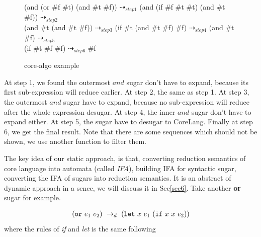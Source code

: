 \begin{figure}[ht]
\parbox[t]{\textwidth}{
\begin{Codes}
    (and (or \#f \#t) (and \#t \#f)) $\dashrightarrow_{step1}$
(and (if \#f \#t \#t) (and \#t \#f)) $\dashrightarrow_{step2}$\\
(and \#t (and \#t \#f)) $\dashrightarrow_{step3}$
(if \#t (and \#t \#f) \#f) $\dashrightarrow_{step4}$
(and \#t \#f) $\dashrightarrow_{step5}$\\
(if \#t \#f \#f) $\dashrightarrow_{step6}$
\#f
\end{Codes}
		}
\caption{core-algo example}
\label{fig:core-algo}
\end{figure}

At step 1, we found the outermost $and$ sugar don't have to expand, because its first sub-expression will reduce earlier. At step 2, the same as step 1. At step 3, the outermost $and$ sugar have to expand, because no sub-expression will reduce after the whole expression desugar. At step 4, the inner $and$ sugar don't have to expand either. At step 5, the sugar have to desugar to CoreLang. Finally at step 6, we get the final result. Note that there are some sequences which should not be shown, we use another function to filter them.

The key idea of our static approach, is that, converting reduction semantics of core language into automata (called \emph{IFA}), building IFA for syntactic sugar, converting the IFA of sugars into reduction semantics. It is an abstract of dynamic approach in a sence, we will discuss it in Sec\ref{sec6}. Take another {\bfseries or} sugar for example.

\[
\begin{array}{l}
(\mbox{\tt or}~e_1~e_2) ~\rightarrow_d~ (\mbox{\tt let}~x~e_1~(\mbox{\tt if}~x~x~e_2))
\end{array}
\]
where the rules of \emph{if} and \emph{let} is the same following

